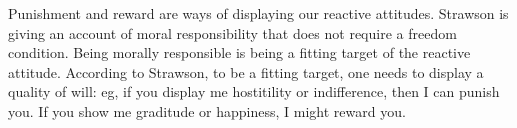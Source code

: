 \documentclass{article}
\begin{document}
Punishment and reward are ways of displaying our reactive attitudes. Strawson
is giving an account of moral responsibility that does not require a freedom
condition. Being morally responsible is being a fitting target of the
reactive attitude. According to Strawson, to be  a fitting target, one needs
to display a quality of will: eg, if you display me hostitility or indifference,
then I can punish you. If you show me graditude or happiness, I might reward
you. 



\nocite{*} \printbibliography
\end{document}
